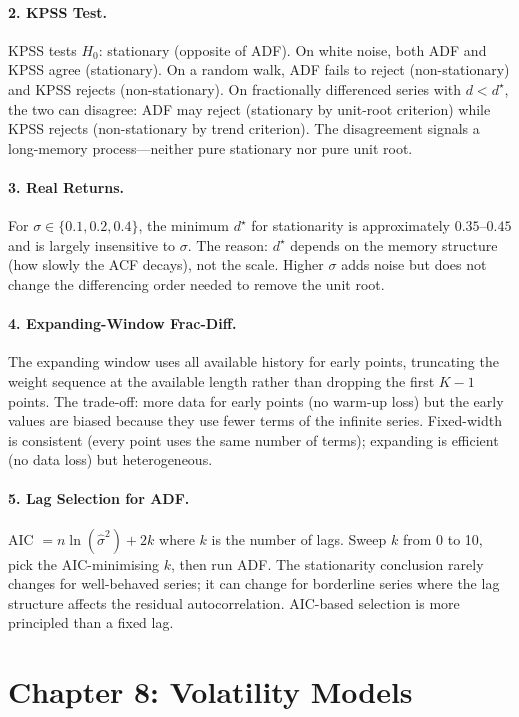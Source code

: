 \paragraph{2. KPSS Test.}
KPSS tests $H_0$: stationary (opposite of ADF). On white noise, both
ADF and KPSS agree (stationary). On a random walk, ADF fails to
reject (non-stationary) and KPSS rejects (non-stationary). On
fractionally differenced series with $d < d^\star$, the two can
disagree: ADF may reject (stationary by unit-root criterion) while
KPSS rejects (non-stationary by trend criterion). The disagreement
signals a long-memory process---neither pure stationary nor pure
unit root.

\paragraph{3. Real Returns.}
For $\sigma \in \{0.1, 0.2, 0.4\}$, the minimum $d^\star$ for
stationarity is approximately $0.35$--$0.45$ and is largely
insensitive to $\sigma$. The reason: $d^\star$ depends on the
memory structure (how slowly the ACF decays), not the scale. Higher
$\sigma$ adds noise but does not change the differencing order
needed to remove the unit root.

\paragraph{4. Expanding-Window Frac-Diff.}
The expanding window uses all available history for early points,
truncating the weight sequence at the available length rather than
dropping the first $K-1$ points. The trade-off: more data for early
points (no warm-up loss) but the early values are biased because
they use fewer terms of the infinite series. Fixed-width is
consistent (every point uses the same number of terms); expanding
is efficient (no data loss) but heterogeneous.

\paragraph{5. Lag Selection for ADF.}
AIC $= n \ln(\hat{\sigma}^2) + 2k$ where $k$ is the number of lags.
Sweep $k$ from 0 to 10, pick the AIC-minimising $k$, then run ADF.
The stationarity conclusion rarely changes for well-behaved series;
it can change for borderline series where the lag structure affects
the residual autocorrelation. AIC-based selection is more
principled than a fixed lag.

\section*{Chapter 8: Volatility Models}

